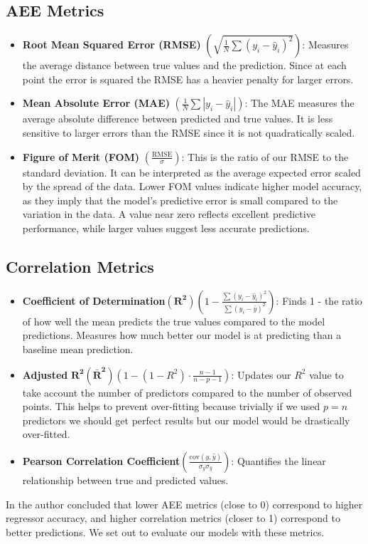 \documentclass{ucdgradtaughtthesis}
\begin{document}
\subsection{AEE Metrics}
\begin{itemize}
    \item \textbf{Root Mean Squared Error (RMSE)} \( \left(\sqrt{\frac{1}{N} \sum (y_i - \hat{y}_i)^2} \right)\): Measures the average distance between true values and the prediction. Since at each point the error is squared the RMSE has a heavier penalty for larger errors.
    \item \textbf{Mean Absolute Error (MAE)} \( \left( \frac{1}{N} \sum |y_i - \hat{y}_i|\right) \):  The MAE measures the average absolute difference between predicted and true values. It is less sensitive to larger errors than the RMSE since it is not quadratically scaled.
    \item \textbf{Figure of Merit (FOM)} \( \left( \frac{\text{RMSE}}{\sigma}\right) \): This is the ratio of our RMSE to the standard deviation. It can be interpreted as the average expected error scaled by the spread of the data. 
    Lower FOM values indicate higher model accuracy, as they imply that the model's predictive error is small compared to the variation in the data. A value near zero reflects excellent predictive performance, while larger values suggest less accurate predictions.
\end{itemize}

\subsection{Correlation Metrics}
\begin{itemize}
    \item \textbf{Coefficient of Determination}\(\left(\mathbf{R^2}\right)\)\( \left(1 - \frac{\sum (y_i - \hat{y}_i)^2}{\sum (y_i - \bar{y})^2}\right) \): Finds 1 - the ratio of how well the mean predicts the true values compared to the model predictions. Measures how much better our model is at predicting than a baseline mean prediction.
    
    \item \textbf{Adjusted} \(\mathbf{R^2 \left( \bar{R}^2\right)}\)\( \left( 1 - (1 - R^2) \cdot \frac{n - 1}{n - p - 1} \right) \): Updates our \( R^2 \) value to take account the number of predictors compared to the number of observed points. This helps to prevent over-fitting because trivially if we used \(p=n\) predictors we should get perfect results but our model would be drastically over-fitted.
    
    \item \textbf{Pearson Correlation Coefficient}\( \left(\frac{\text{cov}(y, \hat{y})}{\sigma_y \sigma_{\hat{y}}} \right) \):  Quantifies the linear relationship between true and predicted values.
\end{itemize}
In \cite{metrics} the author concluded that lower AEE metrics (close to 0) correspond to higher regressor accuracy, and higher correlation metrics (closer to 1) correspond to better predictions. We set out to evaluate our models with these metrics.
\end{document}
